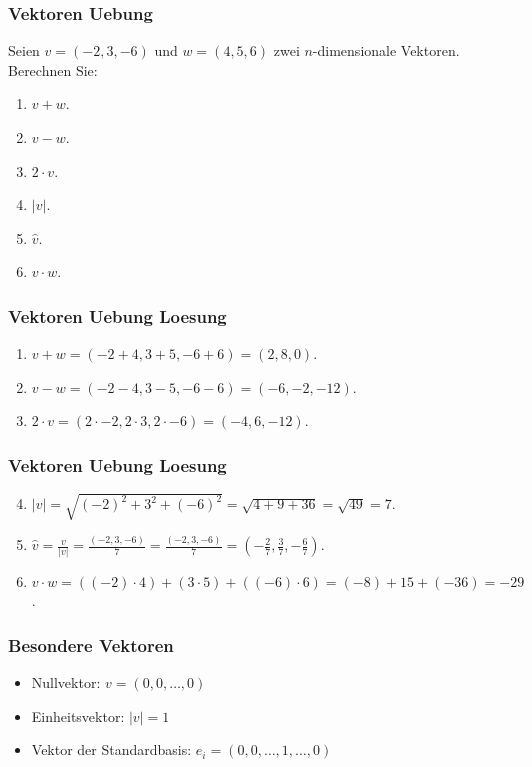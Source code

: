 \begin{frame}
    \frametitle{Vektoren Uebung}
    Seien $v = (-2, 3, -6)$ und $w = (4, 5, 6)$ zwei $n$-dimensionale Vektoren.
    Berechnen Sie:
    \begin{enumerate}
        \item $v + w$.
        \item $v - w$.
        \item $2 \cdot v$.
        \item $|v|$.
        \item $\hat{v}$.
        \item $v \cdot w$.
    \end{enumerate}
\end{frame}

\begin{frame}
    \frametitle{Vektoren Uebung Loesung}
    \begin{enumerate}
        \vfill \item $v + w = (-2 + 4, 3 + 5, -6 + 6) = (2, 8, 0)$.
        \vfill \item $v - w = (-2 - 4, 3 - 5, -6 - 6) = (-6, -2, -12)$.
        \vfill \item $2 \cdot v = (2 \cdot -2, 2 \cdot 3, 2 \cdot -6) = (-4, 6, -12)$.
    \end{enumerate}
\end{frame}

\begin{frame}
    \frametitle{Vektoren Uebung Loesung}
    \begin{enumerate}
        \setcounter{enumi}{3}
        \vfill \item $|v| = \sqrt{(-2)^2 + 3^2 + (-6)^2} = \sqrt{4 + 9 + 36} = \sqrt{49} = 7$.
        \vfill \item $\hat{v} = \frac{v}{|v|} = \frac{(-2, 3, -6)}{7} = \frac{(-2, 3, -6)}{7} = (-\frac{2}{7}, \frac{3}{7}, -\frac{6}{7})$.
        \vfill \item $v \cdot w = ((-2) \cdot 4) + (3 \cdot 5) + ((-6) \cdot 6) = (-8) + 15 + (-36) = -29$.
    \end{enumerate}
\end{frame}

\begin{frame}
    \frametitle{Besondere Vektoren}
    \begin{itemize}
        \item Nullvektor: $v = (0, 0, \dots, 0)$
        \item Einheitsvektor: $|v| = 1$
        \item Vektor der Standardbasis: $e_i = (0, 0, \dots, 1, \dots, 0)$
    \end{itemize}
\end{frame}

